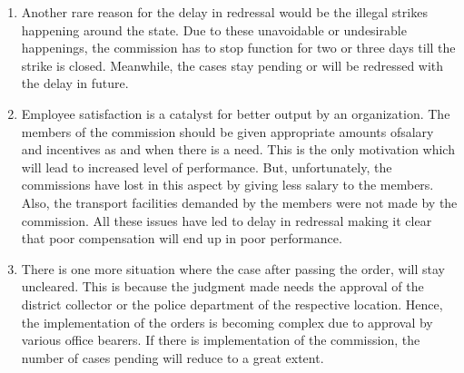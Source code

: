 \begin{multicols}{2}
\begin{enumerate}[label=$\bullet$]
\item Another rare reason for the delay in redressal would be the illegal strikes happening
around the state. Due to these unavoidable or undesirable happenings, the commission
has to stop function for two or three days till the strike is closed. Meanwhile, the cases
stay pending or will be redressed with the delay in future.

\item Employee satisfaction is a catalyst for better output by an organization. The members
of the commission should be given appropriate amounts ofsalary and incentives as and
when there is a need. This is the only motivation which will lead to increased level of
performance. But, unfortunately, the commissions have lost in this aspect by giving less
salary to the members. Also, the transport facilities demanded by the members were not made by the commission. All these issues have led to delay in redressal making it clear
that poor compensation will end up in poor performance.

\item There is one more situation where the case after passing the order, will stay uncleared.
This is because the judgment made needs the approval of the district collector or the
police department of the respective location. Hence, the implementation of the orders
is becoming complex due to approval by various office bearers. If there is
implementation of the commission, the number of cases pending will reduce to a great
extent.
\end{enumerate}


\end{multicols}
